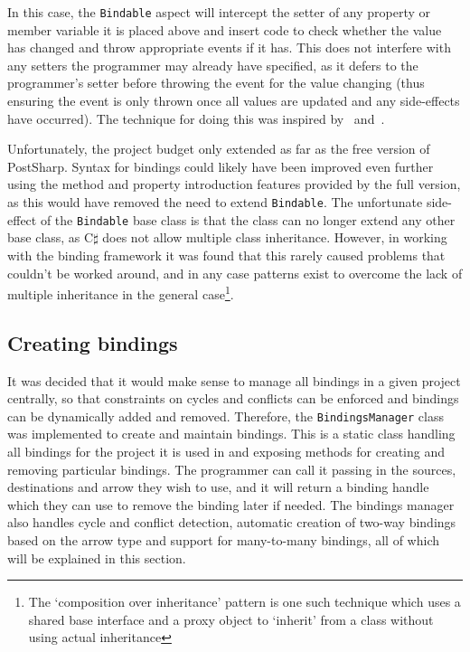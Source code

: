\documentclass[12pt,twoside,notitlepage]{report}
\begin{document}
In this case, the \texttt{Bindable} aspect will intercept the setter of any property or member variable it is placed above and insert code to check whether the value has changed and throw appropriate events if it has. This does not interfere with any setters the programmer may already have specified, as it defers to the programmer's setter before throwing the event for the value changing (thus ensuring the event is only thrown once all values are updated and any side-effects have occurred). The technique for doing this was inspired by~\cite{postsharp_propertychanged} and~\cite{postsharp_locationinterception}.

Unfortunately, the project budget only extended as far as the free version of PostSharp. Syntax for bindings could likely have been improved even further using the method and property introduction features provided by the full version, as this would have removed the need to extend \texttt{Bindable}. The unfortunate side-effect of the \texttt{Bindable} base class is that the class can no longer extend any other base class, as C$\sharp$ does not allow multiple class inheritance. However, in working with the binding framework it was found that this rarely caused problems that couldn't be worked around, and in any case patterns exist to overcome the lack of multiple inheritance in the general case\footnote{The `composition over inheritance' pattern is one such technique which uses a shared base interface and a proxy object to `inherit' from a class without using actual inheritance}.

\subsection{Creating bindings}

It was decided that it would make sense to manage all bindings in a given project centrally, so that constraints on cycles and conflicts can be enforced and bindings can be dynamically added and removed. Therefore, the \texttt{BindingsManager} class was implemented to create and maintain bindings. This is a static class handling all bindings for the project it is used in and exposing methods for creating and removing particular bindings. The programmer can call it passing in the sources, destinations and arrow they wish to use, and it will return a binding handle which they can use to remove the binding later if needed. The bindings manager also handles cycle and conflict detection, automatic creation of two-way bindings based on the arrow type and support for many-to-many bindings, all of which will be explained in this section.
\end{document}
